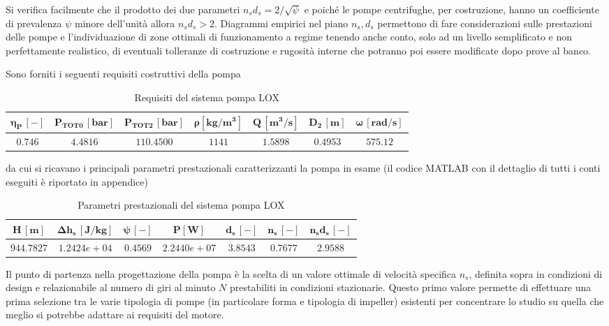 Si verifica facilmente che il prodotto dei due parametri $n_s d_s = {2}/{\sqrt\psi}$  e poiché le pompe centrifughe, per costruzione, hanno un coefficiente di prevalenza $\psi$ minore dell’unità allora $n_s d_s > 2$. Diagrammi empirici nel piano $n_s, d_s$ permettono di fare considerazioni sulle prestazioni delle pompe e l’individuazione di zone ottimali di funzionamento a regime tenendo anche conto, solo ad un livello semplificato e non perfettamente realistico, di eventuali tolleranze di costruzione e rugosità interne che potranno poi essere modificate dopo prove al banco.

Sono forniti i seguenti requisiti costruttivi della pompa \cite{turbopump_manual}
\begin{table}[H]
\centering
\begin{tabular}{|c|c|c|c|c|c|c|}
\hline
$\bm{\eta_P \, [-]}$ & $\bm{P_ {TOT0} \, [bar]}$ & $\bm{P_{TOT2} \, [bar]}$ & $\bm{\rho [kg/m^3]}$ & $\bm{Q \, [m^3/s]}$ & $\bm{D_2 \, [m]}$ & $\bm{\omega \, [rad/s]}$  \\
\hline
$0.746$ & $4.4816$ & $110.4500$ &  $1141$ & $1.5898$ & $0.4953$ & $575.12$  \\
\hline
\end{tabular}

\caption{Requisiti del sistema pompa LOX}
\label{table:LOX pump specs}

\end{table}

 da cui si ricavano i principali parametri prestazionali caratterizzanti la pompa in esame (il codice MATLAB con il dettaglio di tutti i conti eseguiti è riportato in appendice)

\begin{table}[H]
\centering
\begin{tabular}{|c|c|c|c|c|c|c|}
\hline
$\bm{H \, [m]}$ & $\bm{\Delta h_s \, [J/kg]}$ & $\bm{\psi \, [-]}$ & $\bm{P [W]}$ & $\bm{d_s \, [-]}$ & $\bm{n_s \, [-]}$ & $\bm{n_s d_s \, [-]}$  \\
\hline
$944.7827$ & $1.2424e+04$ & $0.4569$ &  $2.2440e+07$ & $3.8543$ & $0.7677$ & $2.9588$  \\
\hline
\end{tabular}

\caption{Parametri prestazionali del sistema pompa LOX}
\label{table:LOX pump performance}

\end{table}

Il punto di partenza nella progettazione della pompa è la scelta di un valore ottimale di velocità specifica $n_s$, definita sopra in condizioni di design e relazionabile al numero di giri al minuto $N$ prestabiliti in condizioni stazionarie. Questo primo valore permette di effettuare una prima selezione tra le varie tipologia di pompe (in particolare forma e tipologia di impeller) esistenti per concentrare lo studio su quella che meglio si potrebbe adattare ai requisiti del motore.
 \\

